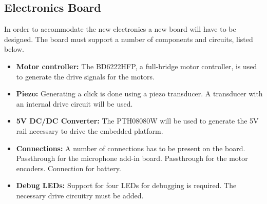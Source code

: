 \documentclass[11pt]{article}
\begin{document}
\subsection{Electronics Board} %
\label{sub:electronics_board}
In order to accommodate the new electronics a new board will have to be designed.
The board must support a number of components and circuits, listed below.
\begin{itemize}
	\item \textbf{Motor controller:} The BD6222HFP, a full-bridge motor controller, is used to generate the drive signals for the motors.
	\item \textbf{Piezo:} Generating a click is done using a piezo transducer.
	A transducer with an internal drive circuit will be used.
	\item \textbf{5V DC/DC Converter:} The PTH08080W will be used to generate the 5V rail necessary to drive the embedded platform.
	\item \textbf{Connections:} A number of connections has to be present on the board.
	Passthrough for the microphone add-in board.
	Passthrough for the motor encoders.
	Connection for battery.
	\item \textbf{Debug LEDs:} Support for four LEDs for debugging is required.
	The necessary drive circuitry must be added.
\end{itemize}

\end{document}
